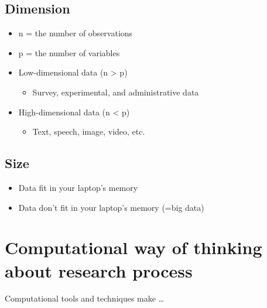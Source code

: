 \documentclass[
]{book}
\providecommand{\tightlist}{%
  \setlength{\itemsep}{0pt}\setlength{\parskip}{0pt}}
\begin{document}
\hypertarget{dimension}{%
\subsection{Dimension}\label{dimension}}

\begin{itemize}
\item
  n = the number of observations
\item
  p = the number of variables
\item
  Low-dimensional data (n \textgreater{} p)

  \begin{itemize}
  \tightlist
  \item
    Survey, experimental, and administrative data
  \end{itemize}
\item
  High-dimensional data (n \textless{} p)

  \begin{itemize}
  \tightlist
  \item
    Text, speech, image, video, etc.
  \end{itemize}
\end{itemize}

\hypertarget{size}{%
\subsection{Size}\label{size}}

\begin{itemize}
\tightlist
\item
  Data fit in your laptop's memory
\item
  Data don't fit in your laptop's memory (=big data)
\end{itemize}

\hypertarget{computational-way-of-thinking-about-research-process}{%
\section{Computational way of thinking about research process}\label{computational-way-of-thinking-about-research-process}}

Computational tools and techniques make \ldots{}
\end{document}
